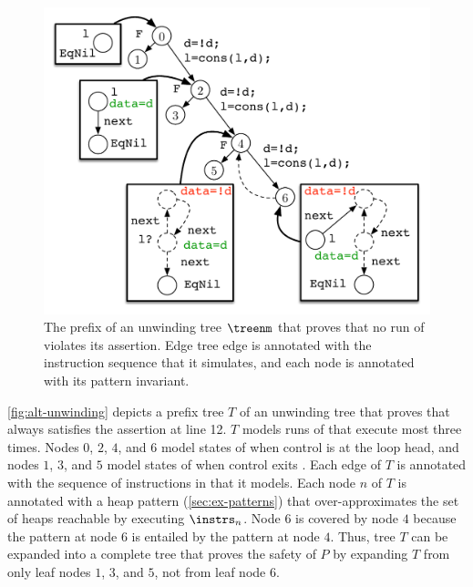 \begin{figure}
  \centering
  \includegraphics[width=\linewidth]{fig/alt-tree.pdf}
  \caption{The prefix of an unwinding tree $\treenm$ that proves that
    no run of \altlist violates its assertion.
    Edge tree edge is annotated with the instruction sequence that it
    simulates, and each node is annotated with its pattern invariant.
  }
  \label{fig:alt-unwinding}
\end{figure}

\begin{ex}
  \label{ex:alt-list-pf}
  \autoref{fig:alt-unwinding} depicts a prefix tree $T$ of an
  unwinding tree that proves that \altlist always satisfies the
  assertion at line 12.
  $T$ models runs of \altlist that execute \consloop most three times.
  Nodes $0$, $2$, $4$, and $6$ model states of \altlist when control
  is at the loop head, and
  nodes $1$, $3$, and $5$ model states of \altlist when control exits
  \consloop.
  Each edge of $T$ is annotated with the sequence of instructions in
  \altlist that it models.
  Each node $n$ of $T$ is annotated with a heap pattern
  (\autoref{sec:ex-patterns}) that over-approximates the set of heaps
  reachable by executing $\instrs_n$.
  Node $6$ is covered by node $4$ because the pattern at node $6$ is
  entailed by the pattern at node $4$.
  Thus, tree $T$ can be expanded into a complete tree that proves the
  safety of $P$ by expanding $T$ from only leaf nodes $1$, $3$, and
  $5$, not from leaf node $6$.
\end{ex}

